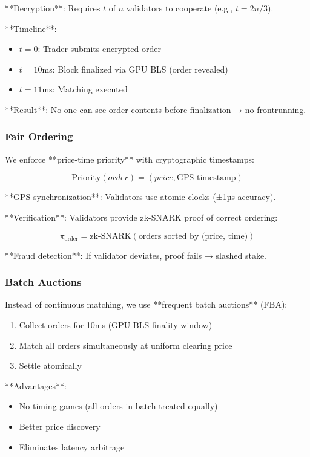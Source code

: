 \documentclass[11pt,letterpaper]{article}
\begin{document}
**Decryption**: Requires $t$ of $n$ validators to cooperate (e.g., $t = 2n/3$).

**Timeline**:
\begin{itemize}
    \item $t=0$: Trader submits encrypted order
    \item $t=10$ms: Block finalized via GPU BLS (order revealed)
    \item $t=11$ms: Matching executed
\end{itemize}

**Result**: No one can see order contents before finalization → no frontrunning.

\subsubsection{Fair Ordering}

We enforce **price-time priority** with cryptographic timestamps:

\begin{equation}
\text{Priority}(order) = (price, \text{GPS-timestamp})
\end{equation}

**GPS synchronization**: Validators use atomic clocks (±1µs accuracy).

**Verification**: Validators provide zk-SNARK proof of correct ordering:

\begin{equation}
\pi_{\text{order}} = \text{zk-SNARK}(\text{orders sorted by (price, time)})
\end{equation}

**Fraud detection**: If validator deviates, proof fails → slashed stake.

\subsubsection{Batch Auctions}

Instead of continuous matching, we use **frequent batch auctions** (FBA):

\begin{enumerate}
    \item Collect orders for 10ms (GPU BLS finality window)
    \item Match all orders simultaneously at uniform clearing price
    \item Settle atomically
\end{enumerate}

**Advantages**:
\begin{itemize}
    \item No timing games (all orders in batch treated equally)
    \item Better price discovery
    \item Eliminates latency arbitrage
\end{itemize}
\end{document}
